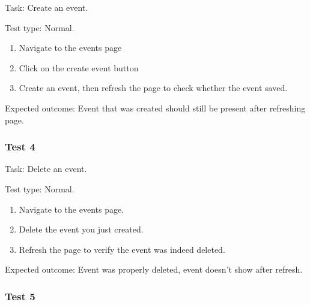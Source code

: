 {\sffamily Task:} Create an event.\\

{\color{gray} \hrulefill}

{\sffamily Test type: Normal.} \\

\begin{enumerate}
  \item Navigate to the events page \\
  \item Click on the create event button \\
  \item Create an event, then refresh the page to check whether the event saved. \\
\end{enumerate}

{\sffamily Expected outcome: } Event that was created should still be present after refreshing page. \\

{\color{gray} \hrulefill}

\subsubsection{Test 4}

{\sffamily Task:} Delete an event.\\

{\color{gray} \hrulefill}

{\sffamily Test type: Normal.} \\

\begin{enumerate}
  \item Navigate to the events page. \\
  \item Delete the event you just created. \\
  \item Refresh the page to verify the event was indeed deleted. \\
\end{enumerate}

{\sffamily Expected outcome: } Event was properly deleted, event doesn't show after refresh. \\

{\color{gray} \hrulefill}

\subsubsection{Test 5}


